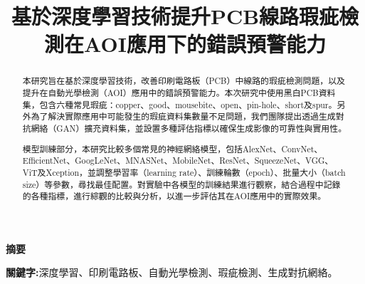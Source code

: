 \title{\fontsize{14}{0} \bf 基於深度學習技術提升PCB線路瑕疵檢測在AOI應用下的錯誤預警能力}
\author{
}
\maketitle %
\begin{flushleft}
  {\fontsize{12}{0} \bf 摘要}
\end{flushleft}
%
%
\begin{abstract}
    \hspace{2em}
    本研究旨在基於深度學習技術，改善印刷電路板（PCB）中線路的瑕疵檢測問題，以及提升在自動光學檢測（AOI）應用中的錯誤預警能力。本次研究中使用黑白PCB資料集，包含六種常見瑕疵：copper、good、mousebite、open、pin-hole、short及spur。另外為了解決實際應用中可能發生的瑕疵資料集數量不足問題，我們團隊提出透過生成對抗網絡（GAN）擴充資料集，並設置多種評估指標以確保生成影像的可靠性與實用性。

    模型訓練部分，本研究比較多個常見的神經網絡模型，包括AlexNet、ConvNet、EfficientNet、GoogLeNet、MNASNet、MobileNet、ResNet、SqueezeNet、VGG、ViT及Xception，並調整學習率（learning rate）、訓練輪數（epoch）、批量大小（batch size）等參數，尋找最佳配置。對實驗中各模型的訓練結果進行觀察，結合過程中記錄的各種指標，進行綜觀的比較與分析，以進一步評估其在AOI應用中的實際效果。\end{abstract}
\begin{IEEEkeywords}
    {\fontsize{10}{0} \bf 關鍵字:}深度學習、印刷電路板、自動光學檢測、瑕疵檢測、生成對抗網絡。
\end{IEEEkeywords}
\IEEEpeerreviewmaketitle
